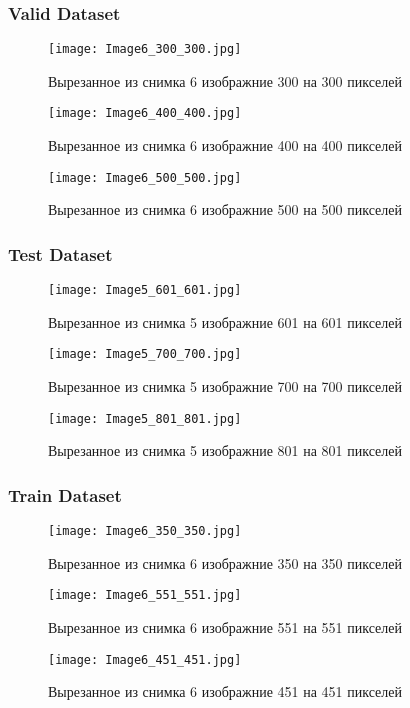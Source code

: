 \documentclass[12pt, a4paper]{report}
\begin{document}
	\subsubsection*{Valid Dataset}
	\large
	\begin{figure}[H]
		\texttt{[image: Image6\_300\_300.jpg]}
		\caption{Вырезанное из снимка 6 изображние 300 на 300 пикселей}
	\end{figure}
	\begin{figure}
		\texttt{[image: Image6\_400\_400.jpg]}
		\caption{Вырезанное из снимка 6 изображние 400 на 400 пикселей}
	\end{figure}
	\begin{figure}
		\texttt{[image: Image6\_500\_500.jpg]}
		\caption{Вырезанное из снимка 6 изображние 500 на 500 пикселей}
	\end{figure}

	\newpage

	\subsubsection*{Test Dataset}
	\large
	\begin{figure}[H]
		\texttt{[image: Image5\_601\_601.jpg]}
		\caption{Вырезанное из снимка 5 изображние 601 на 601 пикселей}
	\end{figure}
	\begin{figure}
		\texttt{[image: Image5\_700\_700.jpg]}
		\caption{Вырезанное из снимка 5 изображние 700 на 700 пикселей}
	\end{figure}
	\begin{figure}
		\texttt{[image: Image5\_801\_801.jpg]}
		\caption{Вырезанное из снимка 5 изображние 801 на 801 пикселей}
	\end{figure}

	\newpage

	\subsubsection*{Train Dataset}
	\large
	\begin{figure}[H]
		\texttt{[image: Image6\_350\_350.jpg]}
		\caption{Вырезанное из снимка 6 изображние 350 на 350 пикселей}
	\end{figure}
	\begin{figure}
		\texttt{[image: Image6\_551\_551.jpg]}
		\caption{Вырезанное из снимка 6 изображние 551 на 551 пикселей}
	\end{figure}
	\begin{figure}
		\texttt{[image: Image6\_451\_451.jpg]}
		\caption{Вырезанное из снимка 6 изображние 451 на 451 пикселей}
	\end{figure}
\end{document}
